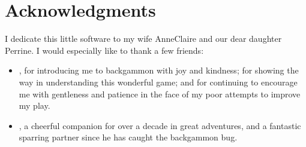 \documentclass[letterpaper,10pt,english]{sphinxmanual}
\begin{document}
\chapter{Acknowledgments}
\label{\detokenize{index:remerciements}}
\sphinxAtStartPar
I dedicate this little software to my wife Anne\sphinxhyphen{}Claire and our dear daughter Perrine. I would especially like to thank a few friends:
\begin{itemize}
\item {} 
\sphinxAtStartPar
{}, for introducing me to backgammon with joy and kindness; for showing the way in understanding this wonderful game; and for continuing to encourage me with gentleness and patience in the face of my poor attempts to improve my play.

\item {} 
\sphinxAtStartPar
{}, a cheerful companion for over a decade in great adventures, and a fantastic sparring partner since he has caught the backgammon bug.

\end{itemize}



\renewcommand{\indexname}{Index}
\printindex
\end{document}
